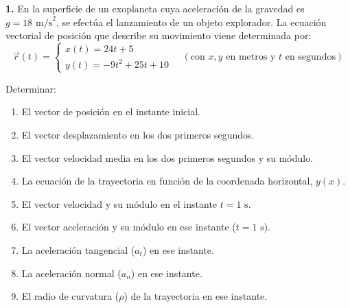 ﻿\documentclass[11pt,a4paper]{article}
\begin{document}
\pagestyle{empty}

\noindent\textbf{1.} En la superficie de un exoplaneta cuya aceleración de la gravedad es $g = 18\text{ m/s}^2$, se efectúa el lanzamiento de un objeto explorador. La ecuación vectorial de posición que describe su movimiento viene determinada por:
\[
\vec{r}(t) = 
\begin{cases}
x(t) = 24t + 5 \\
y(t) = -9t^2 + 25t + 10
\end{cases}
\quad (\text{con } x, y \text{ en metros y } t \text{ en segundos})
\]

\noindent Determinar:

\begin{enumerate}[label=\textbf{\alph*)}, leftmargin=2em, itemsep=6pt]
    \item El vector de posición en el instante inicial.
    \item El vector desplazamiento en los dos primeros segundos.
    \item El vector velocidad media en los dos primeros segundos y su módulo.
    \item La ecuación de la trayectoria en función de la coordenada horizontal, $y(x)$.
    \item El vector velocidad y su módulo en el instante $t = 1\text{ s}$.
    \item El vector aceleración y su módulo en ese instante ($t = 1\text{ s}$).
    \item La aceleración tangencial ($a_t$) en ese instante.
    \item La aceleración normal ($a_n$) en ese instante.
    \item El radio de curvatura ($\rho$) de la trayectoria en ese instante.
\end{enumerate}
\end{document}
